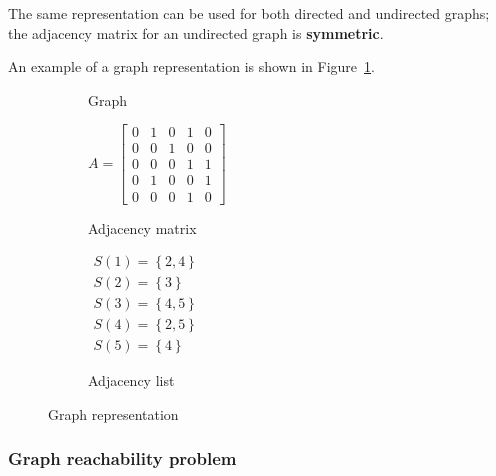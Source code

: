 \documentclass[english]{article}
\begin{document}
The same representation can be used for both directed and undirected graphs;
the adjacency matrix for an undirected graph is \textbf{symmetric}.

\bigskip
An example of a graph representation is shown in Figure~\ref{fig:graph-representation}.

\begin{figure}[htbp]
  \begin{subfigure}{0.33\textwidth}
    \centering
    \caption{Graph}
  \end{subfigure}
  \begin{subfigure}{0.33\textwidth}
    \centering
    \(A = \begin{bmatrix}
      0 & 1 & 0 & 1 & 0 \\
      0 & 0 & 1 & 0 & 0 \\
      0 & 0 & 0 & 1 & 1 \\
      0 & 1 & 0 & 0 & 1 \\
      0 & 0 & 0 & 1 & 0
    \end{bmatrix}\)
    \caption{Adjacency matrix}
  \end{subfigure}
  \begin{subfigure}{0.33\textwidth}
    \centering
    \(\begin{matrix}
      S(1) = \left\{2, 4\right\} \\
      S(2) = \left\{3\right\}    \\
      S(3) = \left\{4, 5\right\} \\
      S(4) = \left\{2, 5\right\} \\
      S(5) = \left\{4\right\}
    \end{matrix}\)
    \caption{Adjacency list}
  \end{subfigure}
  \caption{Graph representation}
  \label{fig:graph-representation}
\end{figure}

\subsubsection{Graph reachability problem}
\end{document}
